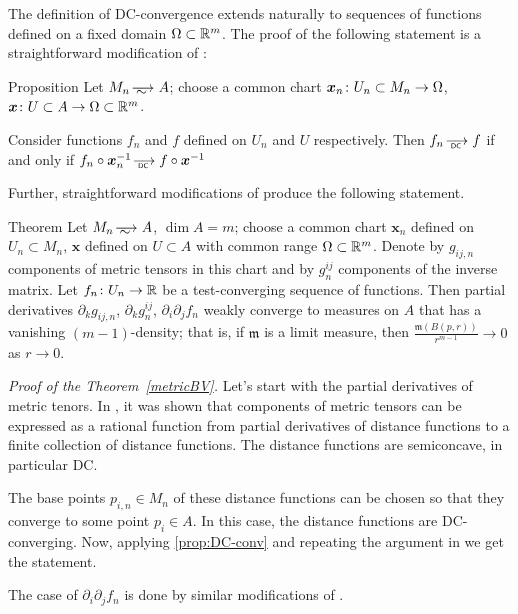 The definition of DC-convergence extends naturally to sequences of functions defined on a fixed domain $\Omega\subset \mathbb{R}^m$.
The proof of the following statement is a straightforward modification of \cite[Section 3]{PerDC}:

\begin{thm}{Proposition}\label{prop:DC-conv}
Let $M_n\smooths{} A$;
choose a common chart $\bm{x}_n\:U_n\zz\subset M_n\to \Omega$, $\bm{x}\colon U\subset A\to \Omega\subset \mathbb{R}^m$.

Consider functions $f_n$ and $f$ defined on $U_n$ and $U$ respectively.
Then $f_n\DCto f$ if and only if $f_n\circ \bm{x}_n^{-1}\DCto f\circ \bm{x}^{-1}$
\end{thm}

Further, straightforward modifications of \cite[Section 4]{PerDC} produce the following statement.

\begin{thm}{Theorem}\label{metricBV}
Let $M_n\smooths{} A$, $\dim A=m$; choose a common chart $\bm{x}_n$ defined on $U_n\subset M_n$, $\bm{x}$ defined on $U\subset A$ with common range $\Omega\subset \mathbb{R}^m$.
Denote by $g_{ij,n}$ components of metric tensors in this chart
and by $g^{ij}_n$ components of the inverse matrix. 
Let $f_n\colon U_n\to \mathbb{R}$ be a test-converging sequence of functions.
Then partial derivatives $\partial_k g_{ij,n}$, $\partial_k g^{ij}_n$, $\partial_i\partial_jf_n$ weakly converge to measures on $A$ that has a vanishing $(m-1)$-density;
that is, if $\mathfrak{m}$ is a limit measure, then $\frac{\mathfrak{m}(B(p,r))}{r^{m-1}}\to 0$ as $r\to 0$.
\end{thm}


{\it Proof of the Theorem~\ref{metricBV}.}
Let's start with the partial derivatives of metric tenors.
In \cite[Section 4.2]{PerDC}, it was shown that components of metric tensors can be expressed as a rational function from partial derivatives of distance functions to a finite collection of distance functions.
The distance functions are semiconcave, in particular DC.

The base points $p_{i,n}\in M_n$ of these distance functions can be chosen so that they converge to some point $p_i\in A$.
In this case, the distance functions are DC-converging.
Now, applying \ref{prop:DC-conv} and repeating the argument in \cite[Section 4.3]{PerDC} we get the statement.

The case of $\partial_i\partial_jf_n$ is done by similar modifications of \cite[Section 4.4]{PerDC}.
\qeds






